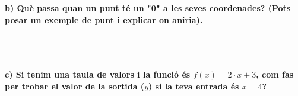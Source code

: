 \documentclass[12pt,a4paper]{article}
\begin{document}
\vspace{0.5cm}

\textbf{b) Què passa quan un punt té un "0" a les seves coordenades? (Pots posar un exemple de punt i explicar on aniria).} \\
\hrulefill \\
\hrulefill \\
\hrulefill \\

\vspace{0.5cm}

\textbf{c) Si tenim una taula de valors i la funció és $f(x) = 2 \cdot x + 3$, com fas per trobar el valor de la sortida ($y$) si la teva entrada és $x = 4$?} \\
\hrulefill \\
\hrulefill \\
\end{document}
